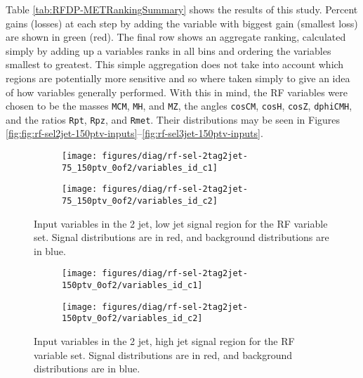 Table \ref{tab:RFDP-METRankingSummary} shows the results of this study.  Percent gains (losses) at each step by adding the variable with biggest gain (smallest loss) are shown in green (red).  The final row shows an aggregate ranking, calculated simply by adding up a variables ranks in all bins and ordering the variables smallest to greatest.  This simple aggregation does not take into account which regions are potentially more sensitive and so where taken simply to give an idea of how variables generally performed.  With this in mind, the RF variables were chosen to be the masses \texttt{MCM}, \texttt{MH}, and \texttt{MZ}, the angles \texttt{cosCM}, \texttt{cosH}, \texttt{cosZ}, \texttt{dphiCMH}, and the ratios \texttt{Rpt}, \texttt{Rpz}, and \texttt{Rmet}.  Their distributions may be seen in Figures \ref{fig:fig:rf-sel2jet-150ptv-inputs}--\ref{fig:rf-sel3jet-150ptv-inputs}.  %

\begin{figure}[!htbp]\captionsetup{justification=centering}
  \centering
\begin{subfigure}[t]{0.49\textwidth}\centering\texttt{[image: figures/diag/rf-sel-2tag2jet-75\_150ptv\_0of2/variables\_id\_c1]}\end{subfigure}
\begin{subfigure}[t]{0.49\textwidth}\centering\texttt{[image: figures/diag/rf-sel-2tag2jet-75\_150ptv\_0of2/variables\_id\_c2]}\end{subfigure}
  \caption{Input variables in the 2 jet, low jet signal region for the RF variable set.  Signal distributions are in red, and background distributions are in blue.}
\label{fig:rf-sel2jet-75_150ptv-inputs}
\end{figure}

\begin{figure}[!htbp]\captionsetup{justification=centering}
  \centering
\begin{subfigure}[t]{0.49\textwidth}\centering\texttt{[image: figures/diag/rf-sel-2tag2jet-150ptv\_0of2/variables\_id\_c1]}\end{subfigure}
\begin{subfigure}[t]{0.49\textwidth}\centering\texttt{[image: figures/diag/rf-sel-2tag2jet-150ptv\_0of2/variables\_id\_c2]}\end{subfigure}
  \caption{Input variables in the 2 jet, high jet signal region for the RF variable set.  Signal distributions are in red, and background distributions are in blue.}
  \label{fig:rf-sel2jet-150ptv-inputs}
\end{figure}

